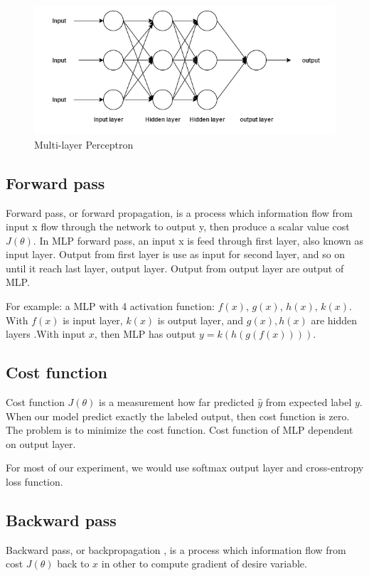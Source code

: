 \begin{figure}[H]
	\centering
	\includegraphics[width=0.7\linewidth]{figure/multilayerperceptron}
	\caption[Multi-layer Perceptron]{Multi-layer Perceptron}
	\label{fig:multilayerperceptron}
\end{figure}

\subsection{Forward pass}
Forward pass, or forward propagation, is a process which information flow from input x flow through the network to output y, then produce a scalar value cost $J(\theta)$. In MLP forward pass, an input x is feed through first layer, also known as input layer. Output from first layer is use as input for second layer, and so on until it reach last layer, output layer. Output from output layer are output of MLP.

For example: a MLP with 4 activation function: $f(x)$, $g(x)$, $h(x)$, $k(x)$. With $f(x)$ is input layer, $k(x)$ is output layer, and $g(x), h(x)$ are hidden layers .With input $x$, then MLP has output $ y = k(h(g(f(x))))$.

\subsection{Cost function}
Cost function $J(\theta)$  is a measurement how far predicted  $\hat y$ from expected label $y$. When our model predict exactly the labeled output, then cost function is zero. The problem is to minimize the cost function. Cost function of MLP dependent on output layer.

For most of our experiment, we would use softmax output layer and cross-entropy loss function.

\subsection{Backward pass}
Backward pass, or backpropagation \cite{rumelhart1988learning}, is a process which information flow from cost $J(\theta)$ back to $x$ in other to compute gradient of desire variable.

